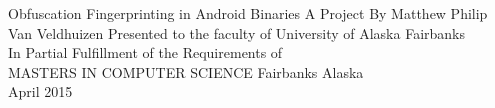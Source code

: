 \begin{titlepage}
\begin{center}

{\fontsize{50}{60}\selectfont Obfuscation Fingerprinting in Android Binaries}
\vfill
{\Large A Project}
\vfill
By Matthew Philip Van Veldhuizen
\vfill
Presented to the faculty of University of Alaska Fairbanks\\
In Partial Fulfillment of the Requirements of\\
MASTERS IN COMPUTER SCIENCE
\vfill
Fairbanks Alaska\\
April 2015

\end{center}
\end{titlepage}